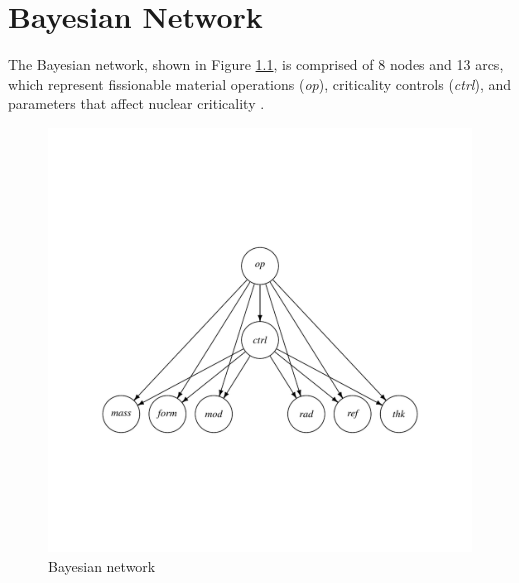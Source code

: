 
\chapter{Bayesian Network}

The Bayesian network, shown in Figure \ref{fig:bn2}, is comprised of 8 nodes and 13 arcs, which represent fissionable material operations (\textit{op}), criticality controls (\textit{ctrl}), and parameters that affect nuclear criticality \cite{mclaughlin}.
%
\begin{figure}[H]
  \centering
  \includegraphics[trim={1cm 4.8cm 1cm 4.8cm}, width=\textwidth]{figures/bn.pdf}
  \caption{Bayesian network}
  \label{fig:bn2}
\end{figure}

